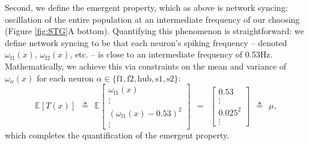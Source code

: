 \documentclass[11pt]{article}
\begin{document}
Second, we define the emergent property, which as above is network syncing: oscillation of the entire population at an intermediate frequency of our choosing (Figure \ref{fig:STG}A bottom).
Quantifying this phenomenon is straightforward: we define network syncing to be that each neuron's spiking frequency -- denoted $\omega_{\text{f1}}(x)$, $\omega_{\text{f2}}(x)$, etc. -- is close to an intermediate frequency of 0.53Hz.  
Mathematically, we achieve this via constraints on the mean and variance of $\omega_\alpha(x)$ for each neuron $\alpha \in \{ \text{f1}, \text{f2}, \text{hub}, \text{s1}, \text{s2} \}$:
\begin{equation}\label{eq:EP}
 \mathbb{E}\left[T(x) \right] ~~\triangleq~~ \mathbb{E}\begin{bmatrix} \omega_{\text{f1}}(x) \\ \vdots \\ (\omega_{\text{f1}}(x) - 0.53)^2 \\ \vdots \end{bmatrix} ~~=~~  
 \begin{bmatrix} 0.53 \\ \vdots \\ 0.025^2 \\ \vdots \end{bmatrix} ~~\triangleq~~ \mu,
 \end{equation}
  which completes the quantification of the emergent property.
\end{document}
